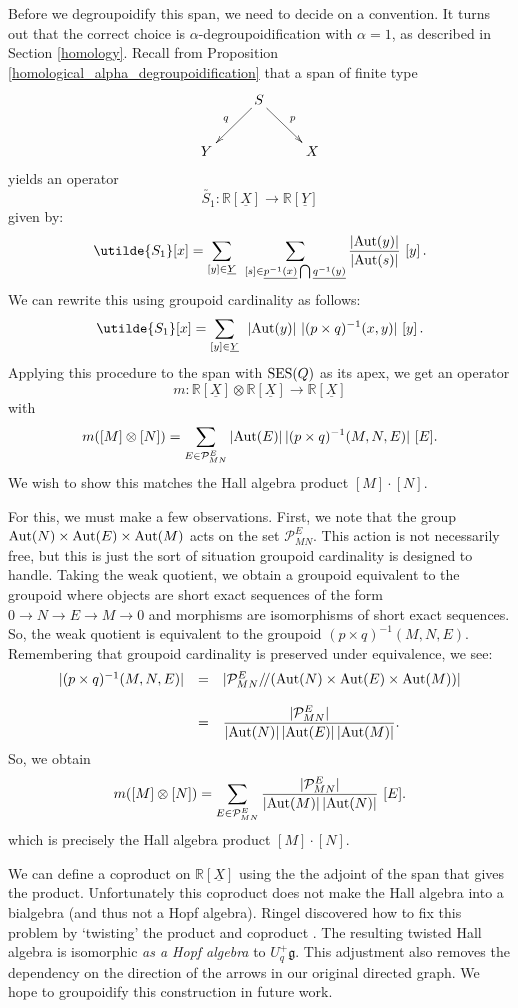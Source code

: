 \documentclass{article}
\newcommand{\SES}{{\rm SES}}
\renewcommand{\to}{\rightarrow}
\newcommand{\tensor}{\otimes}
\newcommand{\maps}{\colon}
\newcommand{\g}{{\mathfrak g}}
\newcommand{\R}{{\mathbb R}}
\newcommand{\Aut}{{\rm Aut}}
\renewcommand{\u}[1]{\underline{#1}}
\begin{document}
Before we degroupoidify this span, we need to decide on a convention.
It turns out that the correct choice is $\alpha$-degroupoidification
with $\alpha = 1$, as described in Section \ref{homology}.  Recall
from Proposition \ref{homological_alpha_degroupoidification} that a
span of finite type
\[\xymatrix{
 & S\ar[dl]_q\ar[dr]^p & \\
 Y & & X \\
}\]
yields an operator 
\[ \utilde{S_1}\maps \R[\u{X}] \to \R[\u{Y}]  \]
given by:
\[
\utilde{S_1} [x] =
\sum_{[y] \in \u{Y}} \;\,
\sum_{[s]\in\u{p^{-1}(x)}\bigcap \u{q^{-1}(y)}}
\frac{|\Aut(y)|}{|\Aut(s)|} \,\, [y]   \, .
\]
We can rewrite this using groupoid cardinality as follows:
\[
\utilde{S_1} [x] =
\sum_{[y] \in \u{Y}} \;\,
|\Aut(y)| \,\, |(p \times q)^{-1}(x,y)| \,\, [y]   \, .
\]
Applying this procedure to the span with $\SES(Q)$ as its apex, we get
an operator
\[  m \maps \R[\u{X}] \tensor \R[\u{X}] \to \R[\u{X}] \]
with
\[ m([M] \tensor [N]) 
= \sum_{E\in\mathcal{P}^E_{MN}}
|\Aut(E)| \, |(p\times q)^{-1}(M,N,E)|  \, \, [E] .  \]
We wish to show this matches the Hall algebra product $[M] \cdot [N]$.

For this, we must make a few observations. First, we note that the
group $\Aut(N) \times \Aut(E) \times \Aut(M)$ acts on the set
$\mathcal{P}^E_{MN}$. This action is not necessarily free, but this is
just the sort of situation groupoid cardinality is designed to handle.
Taking the weak quotient, we obtain a groupoid equivalent to the
groupoid where objects are short exact sequences of the form $0\to
N\to E\to M\to 0$ and morphisms are isomorphisms of short exact
sequences.  So, the weak quotient is equivalent to the groupoid
$(p\times q)^{-1}(M,N,E)$.  Remembering that groupoid cardinality is
preserved under equivalence, we see:
\[
\begin{array}{rcl}
|(p\times q)^{-1}(M,N,E)| &=& 
|\mathcal{P}^E_{MN}/\!/(\Aut(N)\times\Aut(E)\times\Aut(M))| \\  \\
&=& 
\displaystyle{\frac{|\mathcal{P}^E_{MN}|}
{|\Aut(N)| \, |\Aut(E)| \, |\Aut(M)|} . }
\end{array}
\]
So, we obtain
\[ m([M] \tensor [N]) 
= \sum_{E\in\mathcal{P}^E_{MN}}
\frac{|\mathcal{P}^E_{MN}|} {|\Aut(M)| \, |\Aut(N)|}  \,\, [E] .  \]
which is precisely the Hall algebra product $[M] \cdot [N]$.

We can define a coproduct on $\R[\u{X}]$ using the the adjoint of the
span that gives the product.  Unfortunately this coproduct does not
make the Hall algebra into a bialgebra (and thus not a Hopf algebra).
Ringel discovered how to fix this problem by `twisting' the product
and coproduct \cite{Ringel2}.  The resulting twisted Hall algebra is
isomorphic \textit{as a Hopf algebra} to $U_q^+ \g$.  This adjustment
also removes the dependency on the direction of the arrows in our
original directed graph.  We hope to groupoidify this construction in
future work.
\end{document}
